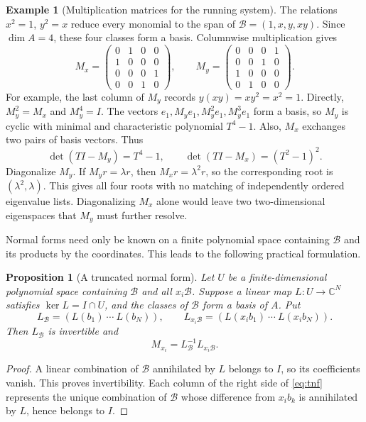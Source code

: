 \documentclass[12pt]{article}
\def\C{\mathbb{C}}
\def\B{\mathcal{B}}
\newtheorem{proposition}[theorem]{Proposition}
\theoremstyle{definition}
\newtheorem{example}[theorem]{Example}
\theoremstyle{remark}
\begin{document}
\begin{example}[Multiplication matrices for the running system]\label{ex:toy}
The relations $x^2=1$, $y^2=x$ reduce every monomial to the span of
$\B=(1,x,y,xy)$. Since $\dim A=4$, these four classes form a basis. Columnwise
multiplication gives
\begin{equation}\label{eq:running-matrices}
M_x=\begin{pmatrix}
0&1&0&0\\1&0&0&0\\0&0&0&1\\0&0&1&0
\end{pmatrix},\qquad
M_y=\begin{pmatrix}
0&0&0&1\\0&0&1&0\\1&0&0&0\\0&1&0&0
\end{pmatrix}.
\end{equation}
For example, the last column of $M_y$ records $y(xy)=xy^2=x^2=1$.
Directly, $M_y^2=M_x$ and $M_y^4=I$. The vectors
$e_1,M_ye_1,M_y^2e_1,M_y^3e_1$ form a basis, so $M_y$ is cyclic with
minimal and characteristic polynomial $T^4-1$. Also, $M_x$ exchanges two pairs
of basis vectors. Thus
\[
\det(TI-M_y)=T^4-1,\qquad \det(TI-M_x)=(T^2-1)^2.
\]
Diagonalize $M_y$. If $M_y r=\lambda r$, then $M_xr=\lambda^2r$, so the
corresponding root is $(\lambda^2,\lambda)$. This gives all four roots with no
matching of independently ordered eigenvalue lists. Diagonalizing $M_x$ alone
would leave two two-dimensional eigenspaces that $M_y$ must further resolve.
\end{example}

Normal forms need only be known on a finite polynomial space containing $\B$ and
its products by the coordinates. This leads to the following practical formulation.

\begin{proposition}[A truncated normal form]\label{prop:tnf}
Let $U$ be a finite-dimensional polynomial space containing $\B$ and all $x_i\B$.
Suppose a linear map $L:U\to\C^N$ satisfies $\ker L=I\cap U$, and the classes
of $\B$ form a basis of $A$. Put
\[
  L_\B=(L(b_1)\ \cdots\ L(b_N)),\qquad
  L_{x_i\B}=(L(x_i b_1)\ \cdots\ L(x_i b_N)).
\]
Then $L_\B$ is invertible and
\begin{equation}\label{eq:tnf}
  M_{x_i}=L_\B^{-1}L_{x_i\B}.
\end{equation}
\end{proposition}

\begin{proof}
A linear combination of $\B$ annihilated by $L$ belongs to $I$, so its coefficients
vanish. This proves invertibility. Each column of the right side of
\eqref{eq:tnf} represents the unique combination of $\B$ whose difference from
$x_ib_k$ is annihilated by $L$, hence belongs to $I$.
\end{proof}
\end{document}
